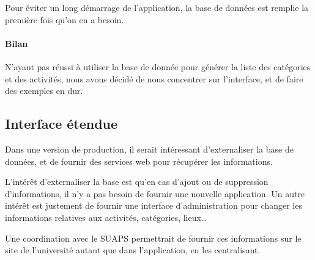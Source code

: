 \documentclass[french, titlepage, 11pt, a4paper]{article}
\begin{document}
        Pour éviter un long démarrage de l'application, la base de données est
        remplie la première fois qu'on en a besoin.

        \paragraph{Bilan} N'ayant pas réussi à utiliser la base de donnée pour
        générer la liste des catégories et des activités, nous avons décidé de
        nous concentrer sur l'interface, et de faire des exemples en dur.


    \subsection{Interface étendue}

        Dans une version de production, il serait intéressant d'externaliser la
        base de données, et de fournir des services web pour récupérer les
        informations.

        L'intérêt d'externaliser la base est qu'en cas d'ajout ou de suppression
        d'informations, il n'y a pas besoin de fournir une nouvelle application.
        Un autre intérêt est justement de fournir une interface d'administration
        pour changer les informations relatives aux activités, catégories,
        lieux\dots

        Une coordination avec le SUAPS permettrait de fournir ces informations
        sur le site de l'université autant que dans l'application, en les centralisant.
\end{document}

